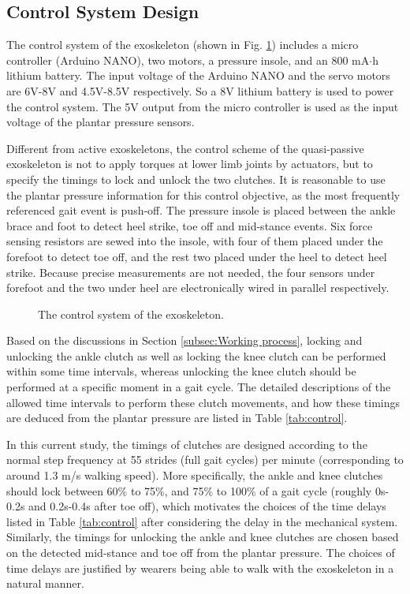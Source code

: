 \documentclass[10pt]{asme2ej}
\begin{document}
\subsection{Control System Design}

The control system of the exoskeleton (shown in Fig. \ref{fig:control}) includes a micro controller (Arduino NANO), two motors, a pressure insole, and an 800 mA$\cdot$h lithium battery.
The input voltage of the Arduino NANO and the servo motors are 6V-8V and 4.5V-8.5V respectively.
So a 8V lithium battery is used to power the control system.
The 5V output from the micro controller is used as the input voltage of the plantar pressure sensors. 

Different from active exoskeletons, the control scheme of the quasi-passive exoskeleton is not to apply torques at lower limb joints by actuators, but to specify the timings to lock and unlock the two clutches.
It is reasonable to use the plantar pressure information for this control objective, as the most frequently referenced gait event is push-off.
The pressure insole is placed between the ankle brace and foot to detect heel strike, toe off and mid-stance events.
Six force sensing resistors are sewed into the insole, with four of them placed under the forefoot to detect toe off, and the rest two placed under the heel to detect heel strike.
Because precise measurements are not needed, the four sensors under forefoot and the two under heel are electronically wired in parallel respectively. 

\begin{figure}[t]
	\caption{The control system of the exoskeleton.}
	\label{fig:control}   
\end{figure}

Based on the discussions in Section \ref{subsec:Working process}, locking and unlocking the ankle clutch as well as locking the knee clutch can be performed within some time intervals, whereas unlocking the knee clutch should be performed at a specific moment in a gait cycle.
The detailed descriptions of the allowed time intervals to perform these clutch movements, and how these timings are deduced from the plantar pressure are listed in Table \ref{tab:control}.

In this current study, the timings of clutches are designed according to the normal step frequency at 55 strides (full gait cycles) per minute (corresponding to around 1.3 m/s walking speed).
More specifically, the ankle and knee clutches should lock between 60\% to 75\%, and 75\% to 100\% of a gait cycle (roughly 0s-0.2s and 0.2s-0.4s after toe off), which motivates the choices of the time delays listed in Table \ref{tab:control} after considering the delay in the mechanical system.
Similarly, the timings for unlocking the ankle and knee clutches are chosen based on the detected mid-stance and toe off from the plantar pressure.
The choices of time delays are justified by wearers being able to walk with the exoskeleton in a natural manner.
\end{document}

